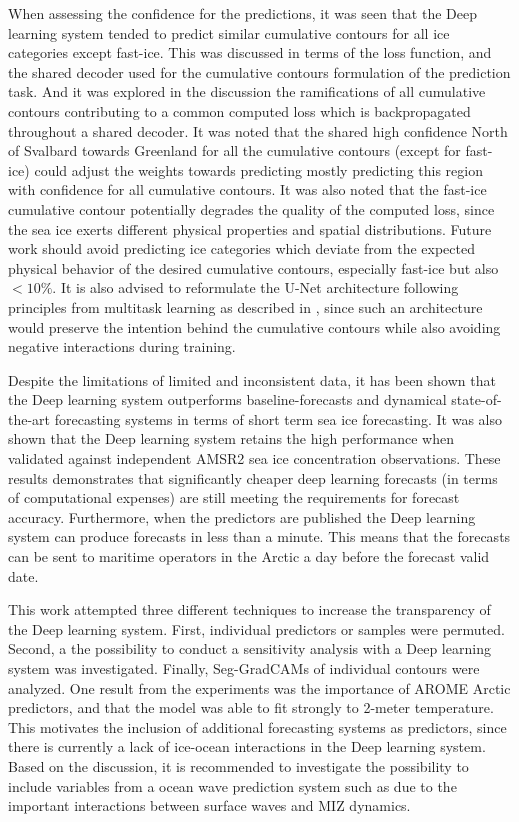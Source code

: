 \documentclass[../main/thesis.tex]{subfiles}
\begin{document}
When assessing the confidence for the predictions, it was seen that the Deep learning system tended to predict similar cumulative contours for all ice categories except fast-ice. This was discussed in terms of the loss function, and the shared decoder used for the cumulative contours formulation of the prediction task. And it was explored in the discussion the ramifications of all cumulative contours contributing to a common computed loss which is backpropagated throughout a shared decoder. It was noted that the shared high confidence North of Svalbard towards Greenland for all the cumulative contours (except for fast-ice) could adjust the weights towards predicting mostly predicting this region with confidence for all cumulative contours. It was also noted that the fast-ice cumulative contour potentially degrades the quality of the computed loss, since the sea ice exerts different physical properties and spatial distributions. Future work should avoid predicting ice categories which deviate from the expected physical behavior of the desired cumulative contours, especially fast-ice but also $<10\%$. It is also advised to reformulate the U-Net architecture following principles from multitask learning as described in \citet{Crawshaw2020}, since such an architecture would preserve the intention behind the cumulative contours while also avoiding negative interactions during training.

Despite the limitations of limited and inconsistent data, it has been shown that the Deep learning system outperforms baseline-forecasts and dynamical state-of-the-art forecasting systems in terms of short term sea ice forecasting. It was also shown that the Deep learning system retains the high performance when validated against independent AMSR2 sea ice concentration observations. These results demonstrates that significantly cheaper deep learning forecasts (in terms of computational expenses) are still meeting the requirements for forecast accuracy. Furthermore, when the predictors are published the Deep learning system can produce forecasts in less than a minute. This means that the forecasts can be sent to maritime operators in the Arctic a day before the forecast valid date.

This work attempted three different techniques to increase the transparency of the Deep learning system. First, individual predictors or samples were permuted. Second, a the possibility to conduct a sensitivity analysis with a Deep learning system was investigated. Finally, Seg-GradCAMs of individual contours were analyzed. One result from the experiments was the importance of AROME Arctic predictors, and that the model was able to fit strongly to 2-meter temperature. This motivates the inclusion of additional forecasting systems as predictors, since there is currently a lack of ice-ocean interactions in the Deep learning system. Based on the discussion, it is recommended to investigate the possibility to include variables from a ocean wave prediction system such as \citet{Carrasco2022} due to the important interactions between surface waves and MIZ dynamics. 
\end{document}
